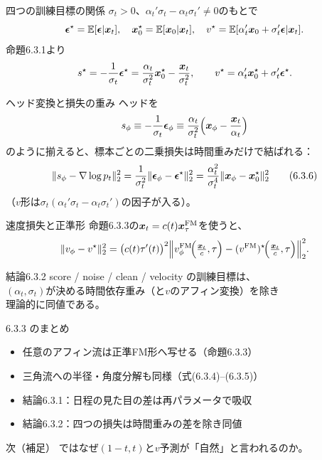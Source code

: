 \asmain
\begin{frame}{四つの訓練目標の関係}
    $\sigma_t>0$、$\alpha_t'\sigma_t-\alpha_t\sigma_t'\neq 0$のもとで
    \[
        \bm{\epsilon}^\star=\mathbb{E}[\bm{\epsilon}|\bm{x}_t],\quad
        \bm{x}_0^\star=\mathbb{E}[\bm{x}_0|\bm{x}_t],\quad
        v^\star=\mathbb{E}[\alpha_t'\bm{x}_0+\sigma_t'\bm{\epsilon}|\bm{x}_t].
    \]
    命題6.3.1より
    \[
        s^\star
        =
        -\frac{1}{\sigma_t}\bm{\epsilon}^\star
        =
        \frac{\alpha_t}{\sigma_t^{2}}\bm{x}_0^\star
        -
        \frac{\bm{x}_t}{\sigma_t^{2}},
        \qquad
        v^\star=\alpha_t'\bm{x}_0^\star+\sigma_t'\bm{\epsilon}^\star.
    \]
\end{frame}
\asmain
\begin{frame}{ヘッド変換と損失の重み}
    ヘッドを
    \[
        s_\phi
        \equiv
        -\frac{1}{\sigma_t}\bm{\epsilon}_\phi
        \equiv
        \frac{\alpha_t}{\sigma_t^{2}}
        \Bigl(\bm{x}_\phi-\frac{\bm{x}_t}{\alpha_t}\Bigr)
    \]
    のように揃えると、標本ごとの二乗損失は時間重みだけで結ばれる：
    \[
        \|s_\phi-\nabla\log p_t\|_{2}^{2}
        =
        \frac{1}{\sigma_t^{2}}\|\bm{\epsilon}_\phi-\bm{\epsilon}^\star\|_{2}^{2}
        =
        \frac{\alpha_t^{2}}{\sigma_t^{4}}\|\bm{x}_\phi-\bm{x}_0^\star\|_{2}^{2}
        \tag{6.3.6}
    \]
    （$v$形は$\sigma_t(\alpha_t'\sigma_t-\alpha_t\sigma_t')$の因子が入る）。
\end{frame}
\asmain
\begin{frame}{速度損失と正準形}
    命題6.3.3の$\bm{x}_t=c(t)\bm{x}_{\tau}^{\mathrm{FM}}$を使うと、
    \[
        \|v_\phi-v^\star\|_{2}^{2}
        =
        \bigl(c(t)\tau'(t)\bigr)^{2}
        \Bigl\|
            v_\phi^{\mathrm{FM}}\!\Bigl(\tfrac{\bm{x}_t}{c},\tau\Bigr)
            -
            (v^{\mathrm{FM}})^\star\!\Bigl(\tfrac{\bm{x}_t}{c},\tau\Bigr)
        \Bigr\|_{2}^{2}.
    \]
    \begin{block}{結論6.3.2}
        score / noise / clean / velocity の訓練目標は、\\
        $(\alpha_t,\sigma_t)$が決める時間依存重み（と$v$のアフィン変換）を除き\\
        理論的に同値である。
    \end{block}
\end{frame}
\asmain
\begin{frame}{6.3.3 のまとめ}
    \begin{itemize}
        \item 任意のアフィン流は正準FM形へ写せる（命題6.3.3）
        \item 三角流への半径・角度分解も同様（式(6.3.4)--(6.3.5)）
        \item 結論6.3.1：日程の見た目の差は再パラメータで吸収
        \item 結論6.3.2：四つの損失は時間重みの差を除き同値
    \end{itemize}
    \begin{block}{次（補足）}
        ではなぜ$(1-t,t)$と$v$予測が「自然」と言われるのか。
    \end{block}
\end{frame}
